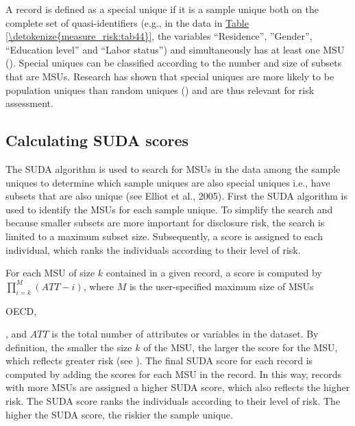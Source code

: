 \documentclass[letterpaper,10pt,english]{sphinxmanual}
\begin{document}
A record is defined as a special unique if it is a sample unique both on
the complete set of quasi-identifiers (e.g., in the data in \hyperref[\detokenize{measure_risk:tab44}]{Table \ref{\detokenize{measure_risk:tab44}}},
the variables “Residence”, ”Gender”, “Education level” and “Labor
status”) and simultaneously has at least one MSU ({\hyperref[\detokenize{measure_risk:elsd98}]{}}).
Special uniques can be classified according to the number and size of
subsets that are MSUs. Research has shown that special uniques are more
likely to be population uniques than random uniques ({\hyperref[\detokenize{measure_risk:elmf02}]{}})
and are thus relevant for risk assessment.


\subsection{Calculating SUDA scores}
\label{\detokenize{measure_risk:calculating-suda-scores}}
The SUDA algorithm is used to search for MSUs in the data among the
sample uniques to determine which sample uniques are also special
uniques i.e., have subsets that are also unique (see Elliot et al.,
2005). First the SUDA algorithm is used to identify the MSUs for each
sample unique. To simplify the search and because smaller subsets are
more important for disclosure risk, the search is limited to a maximum
subset size. Subsequently, a score is assigned to each individual, which
ranks the individuals according to their level of risk.

For each MSU of size \(k\) contained in a given record, a score is
computed by \(\prod_{i = k}^{M}{(ATT - i)}\), where \(M\) is the
user-specified maximum size of MSUs %
\begin{footnote}[12]\sphinxAtStartFootnote
OECD, 
%
\end{footnote}, and
\(ATT\) is the total number of attributes or variables in the
dataset. By definition, the smaller the size \(k\) of the MSU, the
larger the score for the MSU, which reflects greater risk (see {\hyperref[\detokenize{measure_risk:emmg05}]{}}).
The final SUDA score for each record is computed by adding
the scores for each MSU in the record. In this way, records with more
MSUs are assigned a higher SUDA score, which also reflects the higher
risk. The SUDA score ranks the individuals according to their level of
risk. The higher the SUDA score, the riskier the sample unique.
\end{document}
